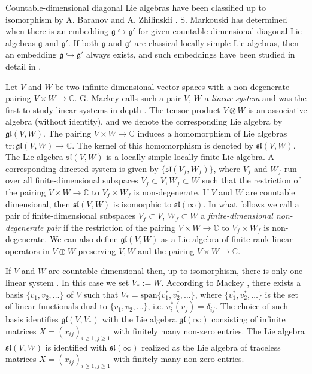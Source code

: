 \documentclass[10pt]{amsart}
\newcommand {\CC} {\mathbb {C}}
\renewcommand{\sl}{\mathfrak{sl}}
\renewcommand{\gg}{\mathfrak{g}}
\renewcommand{\span}{\mathrm{span}}
\newcommand{\gl}{\mathfrak{gl}}
\begin{document}
Countable-dimensional diagonal Lie algebras have been classified up to
isomorphism by A. Baranov and A. Zhilinskii \cite{BZ}. S. Markouski
\cite{M} has determined when there is an embedding $\gg
\hookrightarrow \gg'$ for given countable-dimensional diagonal Lie
algebras $\gg$ and $\gg'$. If both $\gg$ and $\gg'$ are classical
locally simple Lie algebras, then an embedding 
$\gg \hookrightarrow \gg'$ always exists, and such embeddings have been studied in detail in \cite{dip2}.

Let $V$ and $W$ be two infinite-dimensional vector spaces with a non-degenerate pairing $V \times W \rightarrow \CC$. 
G. Mackey calls such a pair $V,\,W$ a \textit{linear system} and was the first to study linear systems in depth \cite{m}.
The tensor product $V\otimes W$ is an associative algebra (without
identity), and we denote the corresponding Lie algebra by 
$\gl(V,W)$.
The pairing $V\times W\to\CC$ induces a homomorphism of Lie algebras
$\mathrm{tr} : \gl(V,W)\to\CC$. The kernel of this homomorphism is
denoted by $\sl(V,W)$. The Lie algebra $\sl(V,W)$ is a locally simple
locally finite Lie algebra. A corresponding directed system is given
by $\{\sl(V_f,W_f)\}$, where $V_f$ and $W_f$ run over all
finite-dimensional subspaces $V_f\subset V, W_f\subset W$ such that
the restriction of the pairing $V \times W \rightarrow \CC$ to
$V_f\times W_f$ is non-degenerate. If $V$ and $W$ are countable
dimensional, then $\sl(V,W)$ is isomorphic to $\sl(\infty)$. In what
follows we call a pair of finite-dimensional subspaces $V_{f} \subset
V$, $W_{f} \subset W$ a \textit{finite-dimensional non-degenerate
  pair} if the restriction of the pairing $V \times W \rightarrow \CC$
to $V_{f} \times W_{f}$ is non-degenerate. We can also define 
$\gl(V,W)$ as a Lie algebra of finite rank linear operators in
$V\oplus W$ preserving $V,W$ and the pairing $V\times W\to\mathbb C$.

If $V$ and $W$ are countable dimensional then, up to isomorphism, there is only one linear system \cite{m}. In this case we set $V_*:=W$. 
According to Mackey \cite{m}, there exists a basis $\lbrace
v_1,v_2,\dots\rbrace$ of $V$ such that 
$V_* = \span \lbrace v^*_1, v^*_2, \dots\rbrace$, 
where $\lbrace v^*_1, v^*_2, \dots\rbrace$ is the set of linear
functionals dual to $\lbrace v_1,v_2,\dots\rbrace$, i.e. $v_i^*(v_j) =
\delta_{ij}$. The choice of such basis identifies $\gl(V,V_*)$ with
the Lie algebra $\gl(\infty)$ consisting of infinite matrices
$X=(x_{ij})_{i\geq 1,j\geq 1}$ with finitely many non-zero
entries. The Lie algebra $\sl(V,W)$ is identified with 
$\sl(\infty)$ realized as the Lie algebra of traceless matrices 
$X = (x_{ij})_{i \geq 1, j\geq 1}$ with finitely many non-zero entries. 
\end{document}

